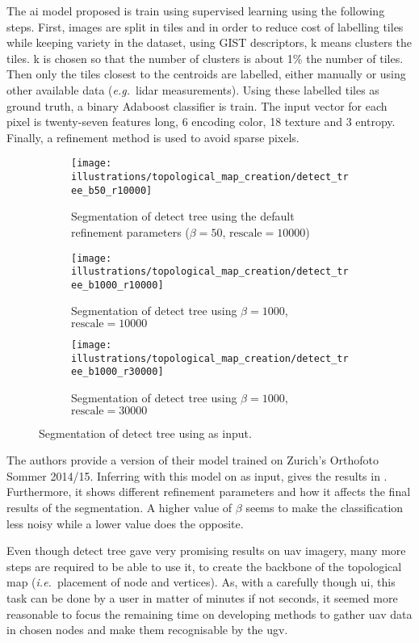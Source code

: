 The \gls{ai} model proposed is train using supervised learning using the following steps.
First, images are split in tiles and in order to reduce cost of labelling tiles while keeping variety in the dataset,
using GIST descriptors, k means clusters the tiles.
k is chosen so that the number of clusters is about 1\% the number of tiles.
Then only the tiles closest to the centroids are labelled, either manually or using other available data (\textit{e.g.}\ \gls{lidar} measurements).
Using these labelled tiles as ground truth, a binary Adaboost classifier is train.
The input vector for each pixel is twenty-seven features long, 6 encoding color, 18 texture and 3 entropy.
Finally, a refinement method is used to avoid sparse pixels.

\begin{figure}
    \begin{subfigure}[t]{.32\textwidth}
        \texttt{[image: illustrations/topological\_map\_creation/detect\_tree\_b50\_r10000]}
        \caption{Segmentation of detect tree using the default refinement parameters ($\beta = 50$, $\text{rescale} = 10000$)}
    \end{subfigure}
    \hfill
    \begin{subfigure}[t]{.32\textwidth}
        \texttt{[image: illustrations/topological\_map\_creation/detect\_tree\_b1000\_r10000]}
        \caption{Segmentation of detect tree using $\beta = 1000$, $\text{rescale} = 10000$}
    \end{subfigure}
    \hfill
    \begin{subfigure}[t]{.32\textwidth}
        \texttt{[image: illustrations/topological\_map\_creation/detect\_tree\_b1000\_r30000]}
        \caption{Segmentation of detect tree using $\beta = 1000$, $\text{rescale} = 30000$}
    \end{subfigure}
    \caption{Segmentation of detect tree using  as input.}
    \label{fig:detect_tree:results}
\end{figure}


The authors provide a version of their model trained on Zurich's Orthofoto Sommer 2014/15.
Inferring with this model on  as input, gives the results in .
Furthermore, it shows different refinement parameters and how it affects the final results of the segmentation.
A higher value of $\beta$ seems to make the classification less noisy while a lower value does the opposite.




Even though detect tree gave very promising results on \gls{uav} imagery, many more steps are required to be able
to use it, to create the backbone of the topological map (\textit{i.e.}\ placement of node and vertices).
As, with a carefully though \gls{ui}, this task can be done by a user in matter of minutes if not seconds, it seemed
more reasonable to focus the remaining time on developing methods to gather \gls{uav} data in chosen nodes and
make them recognisable by the \gls{ugv}.
